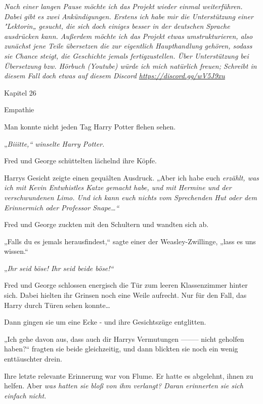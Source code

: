 

\hypertarget{empathie}{%

\emph{Nach einer langen Pause möchte ich das Projekt wieder einmal weiterführen. Dabei gibt es zwei Ankündigungen. Erstens ich habe mir die Unterstützung einer "Lektorin„ gesucht, die sich doch einiges besser in der deutschen Sprache ausdrücken kann. Außerdem möchte ich das Projekt etwas umstrukturieren, also zunächst jene Teile übersetzen die zur eigentlich Haupthandlung gehören, sodass sie Chance steigt, die Geschichte jemals fertigzustellen. Über Unterstützung bei Übersetzung bzw. Hörbuch (Youtube) würde ich mich natürlich freuen; Schreibt in diesem Fall doch etwas auf diesem Discord \url{https://discord.gg/wV5J9xu} ~}

Kapitel 26

Empathie

Man konnte nicht jeden Tag Harry Potter flehen sehen.

„\emph{Biiitte,“ winselte Harry Potter.}

Fred und George schüttelten lächelnd ihre Köpfe.

Harrys Gesicht zeigte einen gequälten Ausdruck. „Aber ich habe euch \emph{erzählt, was ich mit Kevin Entwhistles Katze gemacht habe, und mit Hermine und der verschwundenen Limo. Und ich \emph{kann} euch \emph{nichts} vom Sprechenden Hut oder dem Erinnermich oder Professor Snape…“}

Fred und George zuckten mit den Schultern und wandten sich ab.

„Falls du es jemals herausfindest,“ sagte einer der Weasley-Zwillinge, „lass es uns wissen.“

„\emph{Ihr seid böse! Ihr seid beide böse!“}

Fred und George schlossen energisch die Tür zum leeren Klassenzimmer hinter sich. Dabei hielten ihr Grinsen noch eine Weile aufrecht. Nur für den Fall, das Harry durch Türen sehen konnte…

Dann gingen sie um eine Ecke - und ihre Gesichtszüge entglitten.

„Ich gehe davon aus, dass auch dir Harrys Vermutungen -------- nicht geholfen haben?“ fragten sie beide gleichzeitig, und dann blickten sie noch ein wenig enttäuschter drein.

Ihre letzte relevante Erinnerung war von Flume. Er hatte es abgelehnt, ihnen zu helfen. Aber \emph{was hatten sie bloß von ihm verlangt? Daran erinnerten sie sich einfach nicht.}

}

